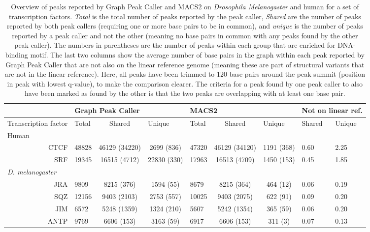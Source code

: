 \documentclass[a4paper,8pt]{article}
\title{}
\author{}
\begin{document}
\begin{table}[!ht]
\begin{adjustwidth}{-1.25in}{0in} %
\centering
\caption{Overview of peaks reported by Graph Peak Caller and MACS2 on \emph{Drosophila Melanogaster} and human for a set of transcription factors. \emph{Total} is the total number of peaks reported by the peak caller, \emph{Shared} are the number of peaks reported by both peak callers (requiring one or more base pairs to be in common), and \emph{unique} is the number of peaks reported by a peak caller and not the other (meaning no base pairs in common with any peaks found by the other peak caller). The numbers in parentheses are the number of peaks within each group that are enriched for DNA-binding motif. The last two columns show the average number of base pairs in the graph within each peak reported by Graph Peak Caller that are not also on the linear reference genome (meaning these are part of structural variants that are not in the linear reference). Here, all peaks have been trimmed to 120 base pairs around the peak summit (position in peak with lowest q-value), to make the comparison clearer. The criteria for a peak found by one peak caller to also have been marked as found by the other is that the two peaks are overlapping with at least one base pair.}
\label{tableS1}
\begin{tabularx}{1.6\textwidth}{Xbccbccbb}
\toprule
& \multicolumn{3}{|l|}{Graph Peak Caller}  & \multicolumn{3}{l|}{MACS2} & \multicolumn{2}{l}{Not on linear ref.}                                                                                    \\ \midrule
\multicolumn{1}{l|}{Transcription factor} & Total & Shared & \multicolumn{1}{l|}{Unique} & Total & Shared & \multicolumn{1}{l|}{Unique} & Shared & Unique \\ \midrule

\multicolumn{1}{l|}{Human} & \multicolumn{8}{l}{} \\
\multicolumn{1}{r|}{CTCF} & 48828 &46129 (34220)	&2699 (836)	&47320 &46129 (34120) &1191 (368) &0.60	 &2.25\\
\multicolumn{1}{r|}{SRF} &19345	 &16515 (4712)	 &22830 (330)	 &17963 &16513 (4709)	 &1450 (153) &0.45	 &1.85 \\

\multicolumn{1}{l|}{\emph{D. melanogaster}} & \multicolumn{8}{l}{} \\
\multicolumn{1}{r|}{JRA} & 9809 &8215 (376)	 &1594 (55)	 &8679 &8215 (364)	 & 464 (12)	&0.06 &0.19 \\
\multicolumn{1}{r|}{SQZ} & 12156 &9403 (2103)	 &2753 (557)	 & 10025& 9403 (2075)	&622 (91)	 &0.09	 &0.20 \\
\multicolumn{1}{r|}{JIM} &6572  &5248 (1359)	 &1324 (210)	 &5607 &5242 (1354)	 &365 (59)	 & 0.06	& 0.20\\
\multicolumn{1}{r|}{ANTP} & 9769	 &6606 (153)	 & 3163 (59)	&6917	 & 6606 (153)	& 311 (3)	&0.07	 & 0.13\\ \bottomrule
\end{tabularx}
\end{adjustwidth}
\end{table}
\end{document}
